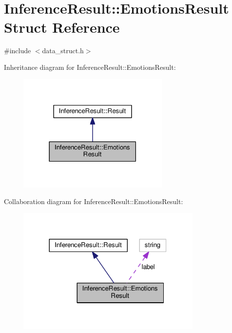 \hypertarget{structInferenceResult_1_1EmotionsResult}{}\section{Inference\+Result\+:\+:Emotions\+Result Struct Reference}
\label{structInferenceResult_1_1EmotionsResult}


{\ttfamily \#include $<$data\+\_\+struct.\+h$>$}



Inheritance diagram for Inference\+Result\+:\+:Emotions\+Result\+:
\nopagebreak
\begin{figure}[H]
\begin{center}
\leavevmode
\includegraphics[width=213pt]{structInferenceResult_1_1EmotionsResult__inherit__graph}
\end{center}
\end{figure}


Collaboration diagram for Inference\+Result\+:\+:Emotions\+Result\+:
\nopagebreak
\begin{figure}[H]
\begin{center}
\leavevmode
\includegraphics[width=260pt]{structInferenceResult_1_1EmotionsResult__coll__graph}
\end{center}
\end{figure}
